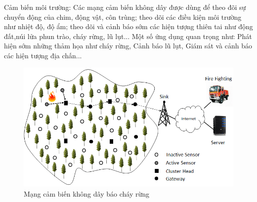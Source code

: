 \documentclass{report}
\begin{document}
\indent
Cảm biến môi trường: Các mạng cảm biến không dây được dùng để theo đõi sự chuyển động
của chim, động vật, côn trùng; theo dõi các điều kiện môi trường như nhiệt độ, độ ẩm;
theo dõi và cảnh báo sớm các hiện tượng thiên tai như động đất,núi lửa phun trào, cháy rừng,
lũ lụt... Một số ứng dụng quan trọng như: Phát hiện sớm những thảm họa như cháy rừng, Cảnh báo lũ lụt, Giám sát và cảnh báo các hiện tượng địa chấn...
\begin{figure}[h]
	\centering
	\includegraphics[scale = 0.5]{fig6.png}
	\caption{Mạng cảm biến không dây báo cháy rừng}
	\label{fig:Graph6}
\end{figure}\\
\end{document}
